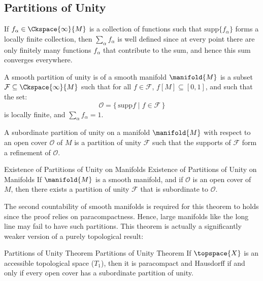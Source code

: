 \documentclass{article}                                                        %
\begin{document}
        \subsection{Partitions of Unity}
            If $f_{\alpha}\in\Ckspace{\infty}{M}$ is a collection of functions
            such that $\textrm{supp}\{f_{\alpha}\}$ forms a locally finite
            collection, then $\sum_{\alpha}f_{\alpha}$ is well defined since
            at every point there are only finitely many functions $f_{\alpha}$
            that contribute to the sum, and hence this sum converges everywhere.
            \begin{definition}
                A smooth partition of unity is of a smooth manifold
                $\manifold{M}$ is a subset
                $\mathcal{F}\subseteq\Ckspace{\infty}{M}$ such that for all
                $f\in\mathcal{F}$, $f[M]\subseteq[0,1]$, and such that the set:
                \begin{equation}
                    \mathcal{O}=\{\,\textrm{supp}{f}\;|\;f\in\mathcal{F}\,\}
                \end{equation}
                is locally finite, and $\sum_{\alpha}f_{\alpha}=1$.
            \end{definition}
            \begin{definition}
                A subordinate partition of unity on a manifold $\manifold{M}$
                with respect to an open cover $\mathcal{O}$ of $M$ is a
                partition of unity $\mathcal{F}$ such that the supports of
                $\mathcal{F}$ form a refinement of $\mathcal{O}$.
            \end{definition}
            \begin{ftheorem}{Existence of Partitions of Unity on Manifolds}
                            {Existence of Partitions of Unity on Manifolds}
                If $\manifold{M}$ is a smooth manifold, and if $\mathcal{O}$ is
                an open cover of $M$, then there exists a partition of unity
                $\mathcal{F}$ that is subordinate to $\mathcal{O}$.
            \end{ftheorem}
            The second countability of smooth manifolds is required for this
            theorem to holds since the proof relies on paracompactness. Hence,
            large manifolds like the long line may fail to have such partitions.
            This theorem is actually a significantly weaker version of a purely
            topological result:
            \begin{ftheorem}{Partitions of Unity Theorem}
                            {Partitions of Unity Theorem}
                If $\topspace{X}$ is an accessible topological space ($T_{1}$),
                then it is paracompact and Hausdorff if and only if every open
                cover has a subordinate partition of unity.
            \end{ftheorem}
\end{document}
